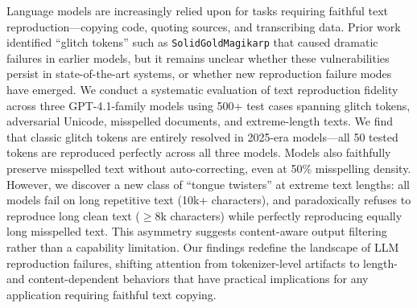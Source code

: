 Language models are increasingly relied upon for tasks requiring faithful text reproduction---copying code, quoting sources, and transcribing data. Prior work identified ``glitch tokens'' such as \texttt{SolidGoldMagikarp} that caused dramatic failures in earlier models, but it remains unclear whether these vulnerabilities persist in state-of-the-art systems, or whether new reproduction failure modes have emerged. We conduct a systematic evaluation of text reproduction fidelity across three GPT-4.1-family models using 500+ test cases spanning glitch tokens, adversarial Unicode, misspelled documents, and extreme-length texts. We find that classic glitch tokens are entirely resolved in 2025-era models---all 50 tested tokens are reproduced perfectly across all three models. Models also faithfully preserve misspelled text without auto-correcting, even at 50\% misspelling density. However, we discover a new class of ``tongue twisters'' at extreme text lengths: all models fail on long repetitive text (10k+ characters), and \gptfull paradoxically refuses to reproduce long clean text ($\geq$8k characters) while perfectly reproducing equally long misspelled text. This asymmetry suggests content-aware output filtering rather than a capability limitation. Our findings redefine the landscape of LLM reproduction failures, shifting attention from tokenizer-level artifacts to length- and content-dependent behaviors that have practical implications for any application requiring faithful text copying.
